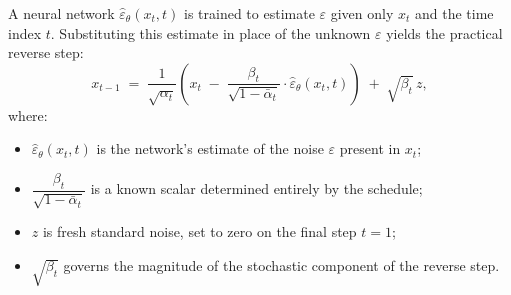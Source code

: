 \documentclass[11pt]{article}
\begin{document}
A neural network $\widehat{\varepsilon}_\theta(x_t, t)$ is trained to estimate $\varepsilon$ given only $x_t$ and the time index $t$.
Substituting this estimate in place of the unknown $\varepsilon$ yields the practical reverse step:
\[
  x_{t-1}
  \;=\;
  \frac{1}{\sqrt{\alpha_t}}
  \!\left(
    x_t \;-\; \frac{\beta_t}{\sqrt{1-\bar{\alpha}_t}} \cdot \widehat{\varepsilon}_\theta(x_t,t)
  \right)
  \;+\;
  \sqrt{\beta_t}\, z,
\]
where:
\begin{itemize}
  \item $\widehat{\varepsilon}_\theta(x_t,t)$ is the network's estimate of the noise $\varepsilon$ present in $x_t$;
  \item $\dfrac{\beta_t}{\sqrt{1-\bar{\alpha}_t}}$ is a known scalar determined entirely by the schedule;
  \item $z$ is fresh standard noise, set to zero on the final step $t=1$;
  \item $\sqrt{\beta_t}$ governs the magnitude of the stochastic component of the reverse step.
\end{itemize}
\end{document}
